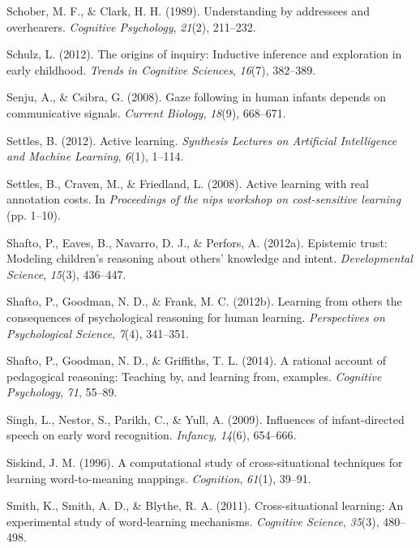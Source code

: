 \documentclass[oneside]{report}
\begin{document}
\hypertarget{ref-schober1989understanding}{}
Schober, M. F., \& Clark, H. H. (1989). Understanding by addressees and
overhearers. \emph{Cognitive Psychology}, \emph{21}(2), 211--232.

\hypertarget{ref-schulz2012origins}{}
Schulz, L. (2012). The origins of inquiry: Inductive inference and
exploration in early childhood. \emph{Trends in Cognitive Sciences},
\emph{16}(7), 382--389.

\hypertarget{ref-senju2008gaze}{}
Senju, A., \& Csibra, G. (2008). Gaze following in human infants depends
on communicative signals. \emph{Current Biology}, \emph{18}(9),
668--671.

\hypertarget{ref-settles2012active}{}
Settles, B. (2012). Active learning. \emph{Synthesis Lectures on
Artificial Intelligence and Machine Learning}, \emph{6}(1), 1--114.

\hypertarget{ref-settles2008active}{}
Settles, B., Craven, M., \& Friedland, L. (2008). Active learning with
real annotation costs. In \emph{Proceedings of the nips workshop on
cost-sensitive learning} (pp. 1--10).

\hypertarget{ref-shafto2012epistemic}{}
Shafto, P., Eaves, B., Navarro, D. J., \& Perfors, A. (2012a). Epistemic
trust: Modeling children's reasoning about others' knowledge and intent.
\emph{Developmental Science}, \emph{15}(3), 436--447.

\hypertarget{ref-shafto2012learning}{}
Shafto, P., Goodman, N. D., \& Frank, M. C. (2012b). Learning from
others the consequences of psychological reasoning for human learning.
\emph{Perspectives on Psychological Science}, \emph{7}(4), 341--351.

\hypertarget{ref-shafto2014rational}{}
Shafto, P., Goodman, N. D., \& Griffiths, T. L. (2014). A rational
account of pedagogical reasoning: Teaching by, and learning from,
examples. \emph{Cognitive Psychology}, \emph{71}, 55--89.

\hypertarget{ref-singh2009influences}{}
Singh, L., Nestor, S., Parikh, C., \& Yull, A. (2009). Influences of
infant-directed speech on early word recognition. \emph{Infancy},
\emph{14}(6), 654--666.

\hypertarget{ref-siskind1996computational}{}
Siskind, J. M. (1996). A computational study of cross-situational
techniques for learning word-to-meaning mappings. \emph{Cognition},
\emph{61}(1), 39--91.

\hypertarget{ref-smith2011cross}{}
Smith, K., Smith, A. D., \& Blythe, R. A. (2011). Cross-situational
learning: An experimental study of word-learning mechanisms.
\emph{Cognitive Science}, \emph{35}(3), 480--498.
\end{document}
